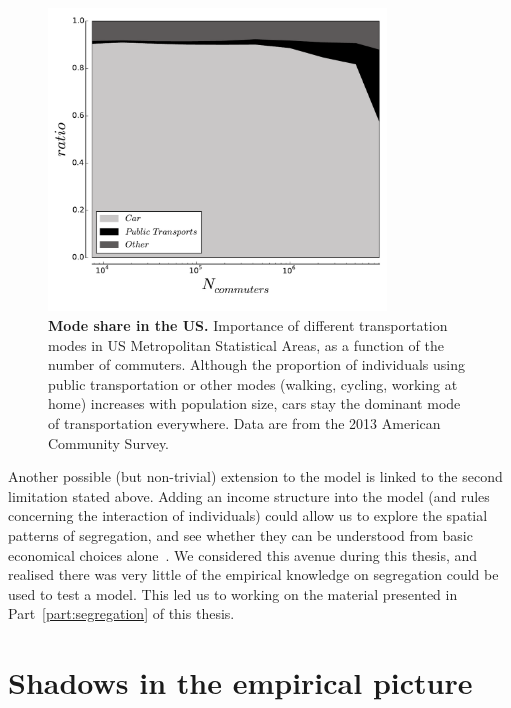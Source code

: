 \begin{figure}[!h]
    \centering
    \includegraphics[width=0.8\textwidth]{gfx/chapter-monocentric/transportation_modes.pdf}
    \caption{{\bf Mode share in the US.} Importance of different transportation modes in US Metropolitan
    Statistical Areas, as a function of the number of commuters. Although the
proportion of individuals using public transportation or other modes (walking,
cycling, working at home) increases with population size, cars stay the dominant
mode of transportation everywhere. Data are from the 2013 American Community
Survey.\label{fig:transportation_mode}}
\end{figure}


Another possible (but non-trivial) extension to the model is linked to the
second limitation stated above. Adding an income structure into the model (and
rules concerning the interaction of individuals) could allow us to explore the
spatial patterns of segregation, and see whether they can be understood from
basic economical choices alone~\cite{Gauvin:2013}. We considered this avenue
during this thesis, and realised there was very little of the empirical
knowledge on segregation could be used to test a model. This led us to working
on the material presented in Part~\ref{part:segregation} of this thesis.\\



\medskip

\section{Shadows in the empirical picture}
\label{sec:empirical}

